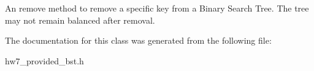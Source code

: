 An remove method to remove a specific key from a Binary Search Tree. The tree may not remain balanced after removal. 

The documentation for this class was generated from the following file\+:\begin{DoxyCompactItemize}
\item 
hw7\+\_\+provided\+\_\+bst.\+h\end{DoxyCompactItemize}
